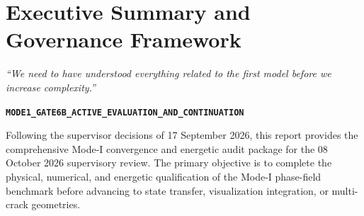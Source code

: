 \section{Executive Summary and Governance Framework}
\label{sec:executive_summary}

\begin{tcolorbox}[colback=blue!5!white,colframe=blue!60!black,title=\textbf{Governing Supervisor Directive \& Active Phase},top=2pt,bottom=2pt,left=4pt,right=4pt]
\small
\emph{``We need to have understood everything related to the first model before we increase complexity.''}
\begin{center}
  \textbf{\texttt{MODE1\_GATE6B\_ACTIVE\_EVALUATION\_AND\_CONTINUATION}}
\end{center}
\end{tcolorbox}

Following the supervisor decisions of 17 September 2026, this report provides the comprehensive Mode-I convergence and energetic audit package for the 08 October 2026 supervisory review. The primary objective is to complete the physical, numerical, and energetic qualification of the Mode-I phase-field benchmark before advancing to state transfer, visualization integration, or multi-crack geometries.


